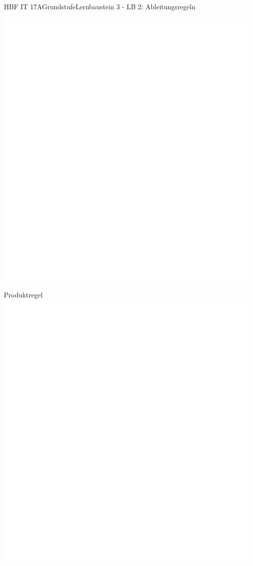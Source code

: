 \documentclass[oneside,openany,headings=optiontotoc,11pt,numbers=noenddot]{scrreprt}
\begin{document}
\begin{worksheet}{HBF IT 17A}{Grundstufe}{Lernbaustein 3 - LB 2: Ableitungsregeln}
\begin{framed}
			\includegraphics[scale=1]{../empty.jpg}
		\end{framed}
		\begin{framed}
			\tiny{\color{codegray}Produktregel}\\
			\includegraphics[scale=0.73]{../empty.jpg}

\end{framed}
\end{worksheet}
\end{document}

